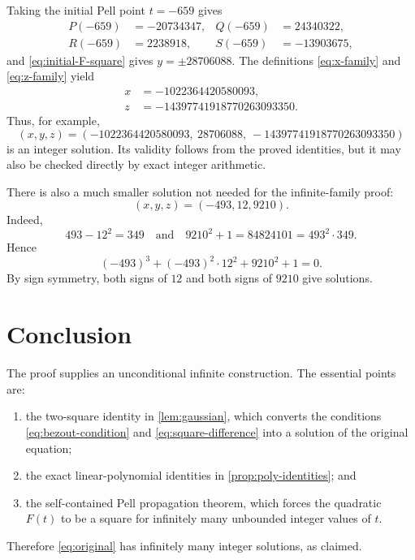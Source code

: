 \documentclass[11pt]{article}
\theoremstyle{remark}
\begin{document}
Taking the initial Pell point $t=-659$ gives
\begin{align*}
 P(-659)&=-20734347,
 &Q(-659)&=24340322,\\
 R(-659)&=2238918,
 &S(-659)&=-13903675,
\end{align*}
and \eqref{eq:initial-F-square} gives $y=\pm28706088$.  The definitions \eqref{eq:x-family} and \eqref{eq:z-family} yield
\begin{align*}
 x&=-1022364420580093,\\
 z&=-14397741918770263093350.
\end{align*}
Thus, for example,
\begin{equation}\label{eq:large-example}
 \boxed{
 (x,y,z)=
 (-1022364420580093,\ 28706088,\ -14397741918770263093350)
 }
\end{equation}
is an integer solution.  Its validity follows from the proved identities, but it may also be checked directly by exact integer arithmetic.

There is also a much smaller solution not needed for the infinite-family proof:
\begin{equation}\label{eq:small-example}
 (x,y,z)=(-493,12,9210).
\end{equation}
Indeed,
\[
 493-12^2=349
 \quad\text{and}\quad
 9210^2+1=84824101=493^2\cdot349.
\]
Hence
\[
 (-493)^3+(-493)^2\cdot12^2+9210^2+1=0.
\]
By sign symmetry, both signs of $12$ and both signs of $9210$ give solutions.

\section{Conclusion}

The proof supplies an unconditional infinite construction.  The essential points are:
\begin{enumerate}
 \item the two-square identity in \cref{lem:gaussian}, which converts the conditions \eqref{eq:bezout-condition} and \eqref{eq:square-difference} into a solution of the original equation;
 \item the exact linear-polynomial identities in \cref{prop:poly-identities}; and
 \item the self-contained Pell propagation theorem, which forces the quadratic $F(t)$ to be a square for infinitely many unbounded integer values of $t$.
\end{enumerate}
Therefore \eqref{eq:original} has infinitely many integer solutions, as claimed.
\end{document}
